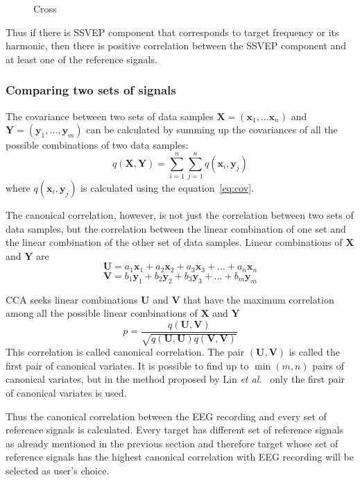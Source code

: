 \begin{figure}[h]
	
	\caption{Cross}
	\label{fig:cross_corr}
\end{figure}

Thus if there is \gls{SSVEP} component that corresponds to \gls{target} frequency or its \gls{harmonic}, then there is positive correlation between the \gls{SSVEP} component and at least one of the reference signals.

\subsubsection{Comparing two sets of signals}

The covariance between two sets of data samples $\mathbf{X}=(\mathbf{x}_1,\dots\mathbf{x}_n)$ and $\mathbf{Y}=(\mathbf{y}_1,\dots,\mathbf{y}_m)$ can be calculated by summing up the covariances of all the possible combinations of two data samples:
\begin{equation}
	q(\mathbf{X}, \mathbf{Y}) = \sum_{i=1}^{n}\sum_{j=1}^{n}q(\mathbf{x}_i, \mathbf{y}_j)
\end{equation}
where $q(\mathbf{x}_i, \mathbf{y}_j)$ is calculated using the equation~\ref{eq:cov}.

The canonical correlation, however, is not just the correlation between two sets of data samples, but the correlation between the linear combination of one set and the linear combination of the other set of data samples. Linear combinations of $\mathbf{X}$ and $\mathbf{Y}$ are
\begin{equation*}
	\mathbf{U} = a_1\mathbf{x}_1 + a_2\mathbf{x}_2 + a_3\mathbf{x}_3 + \dots + a_n\mathbf{x}_n
\end{equation*}
\begin{equation*}
	\mathbf{V} = b_1\mathbf{y}_1 + b_2\mathbf{y}_2 + b_3\mathbf{y}_3 + \dots + b_m\mathbf{y}_m
\end{equation*}

\gls{CCA} seeks linear combinations $\mathbf{U}$ and $\mathbf{V}$ that have the maximum correlation among all the possible linear combinations of $\mathbf{X}$ and $\mathbf{Y}$
\begin{equation}
	p = \frac{q(\mathbf{U}, \mathbf{V})}{\sqrt{q(\mathbf{U},\mathbf{U})q(\mathbf{V},\mathbf{V})}}
\end{equation}
This correlation is called canonical correlation. The pair $(\mathbf{U}, \mathbf{V})$ is called the first pair of canonical variates. It is possible to find up to $\min(m, n)$ pairs of canonical variates, but in the method proposed by Lin \textit{et al.}~\cite{cca_lin} only the first pair of canonical variates is used.

Thus the canonical correlation between the \gls{EEG} recording and every set of reference signals is calculated. Every target has different set of reference signals as already mentioned in the previous section and therefore target whose set of reference signals has the highest canonical correlation with \gls{EEG} recording will be selected as user's choice.
